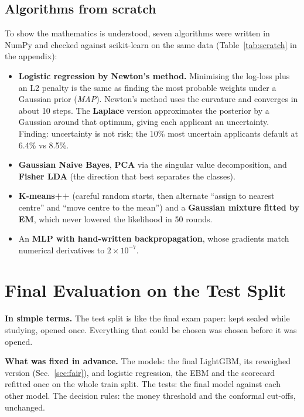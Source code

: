 \documentclass[conference,10pt]{IEEEtran}
\newcommand{\simple}[1]{\par\smallskip\noindent\colorbox{gray!13}{\parbox{\dimexpr\columnwidth-2\fboxsep\relax}{\small\textbf{In simple terms.} #1}}\par\smallskip}
\begin{document}
\subsection{Algorithms from scratch}
To show the mathematics is understood, seven algorithms were written in NumPy and checked against
scikit-learn on the same data (Table~\ref{tab:scratch} in the appendix):
\begin{itemize}
\item \textbf{Logistic regression by Newton's method.} Minimising the log-loss plus an L2
penalty is the same as finding the most probable weights under a Gaussian prior (\emph{MAP}).
Newton's method uses the curvature and converges in about 10 steps. The \textbf{Laplace} version
approximates the posterior by a Gaussian around that optimum, giving each applicant an
uncertainty. Finding: uncertainty is not risk; the 10\% most uncertain applicants default at
6.4\% vs 8.5\%.
\item \textbf{Gaussian Naive Bayes}, \textbf{PCA} via the singular value decomposition, and
\textbf{Fisher LDA} (the direction that best separates the classes).
\item \textbf{K-means++} (careful random starts, then alternate ``assign to nearest centre'' and
``move centre to the mean'') and a \textbf{Gaussian mixture fitted by EM}, which never lowered
the likelihood in 50 rounds.
\item An \textbf{MLP with hand-written backpropagation}, whose gradients match numerical
derivatives to $2\times10^{-7}$.
\end{itemize}

\section{Final Evaluation on the Test Split}
\label{sec:test}
\simple{The test split is like the final exam paper: kept sealed while studying, opened once.
Everything that could be chosen was chosen before it was opened.}

\textbf{What was fixed in advance.} The models: the final LightGBM, its reweighed version
(Sec.~\ref{sec:fair}), and logistic regression, the EBM and the scorecard refitted once on the
whole train split. The tests: the final model against each other model. The decision rules: the
money threshold and the conformal cut-offs, unchanged.
\end{document}
